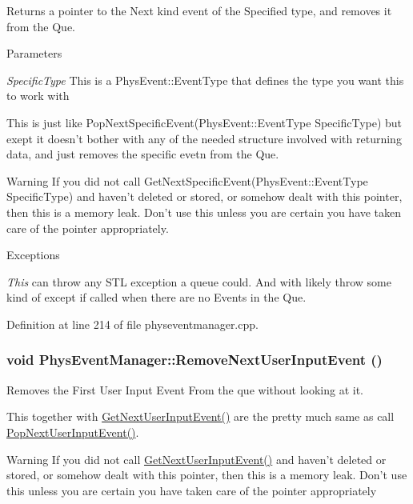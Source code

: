 Returns a pointer to the Next kind event of the Specified type, and removes it from the Que. 


\begin{DoxyParams}{Parameters}
\item[{\em SpecificType}]This is a PhysEvent::EventType that defines the type you want this to work with\end{DoxyParams}
This is just like PopNextSpecificEvent(PhysEvent::EventType SpecificType) but exept it doesn't bother with any of the needed structure involved with returning data, and just removes the specific evetn from the Que. \begin{DoxyWarning}{Warning}
If you did not call GetNextSpecificEvent(PhysEvent::EventType SpecificType) and haven't deleted or stored, or somehow dealt with this pointer, then this is a memory leak. Don't use this unless you are certain you have taken care of the pointer appropriately. 
\end{DoxyWarning}

\begin{DoxyExceptions}{Exceptions}
\item[{\em This}]can throw any STL exception a queue could. And with likely throw some kind of except if called when there are no Events in the Que. \end{DoxyExceptions}


Definition at line 214 of file physeventmanager.cpp.

\hypertarget{classPhysEventManager_a9c6f5296c9961fa469ebe06d7599283a}{
\subsubsection[{RemoveNextUserInputEvent}]{\setlength{\rightskip}{0pt plus 5cm}void PhysEventManager::RemoveNextUserInputEvent ()}}
\label{d5/dd7/classPhysEventManager_a9c6f5296c9961fa469ebe06d7599283a}


Removes the First User Input Event From the que without looking at it. 

This together with \hyperlink{classPhysEventManager_a4874a9b1138d2351bf28e527a66c02b8}{GetNextUserInputEvent()} are the pretty much same as call \hyperlink{classPhysEventManager_ad6612a6e1c728941e2c467e7f136ca51}{PopNextUserInputEvent()}. \begin{DoxyWarning}{Warning}
If you did not call \hyperlink{classPhysEventManager_a4874a9b1138d2351bf28e527a66c02b8}{GetNextUserInputEvent()} and haven't deleted or stored, or somehow dealt with this pointer, then this is a memory leak. Don't use this unless you are certain you have taken care of the pointer appropriately 
\end{DoxyWarning}

